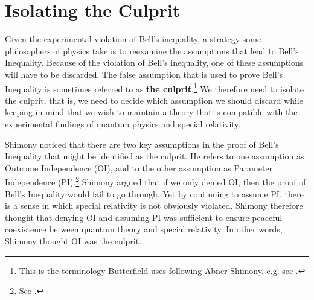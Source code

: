\documentclass[12pt]{report}
\providecommand{\DIFadd}[1]{{\protect\color{blue}\uwave{#1}}} %
\providecommand{\DIFaddbegin}{} %
\providecommand{\DIFaddend}{} %
\begin{document}
\section{Isolating the Culprit}
Given the experimental violation of Bell's inequality, a strategy some philosophers of physics take is to reexamine the assumptions that lead to Bell's Inequality. Because of the \DIFaddbegin \DIFadd{observed }\DIFaddend violation of Bell's inequality, one of these assumptions will have to be discarded. The false assumption that is used to prove Bell's Inequality is sometimes referred to as \textbf{the culprit}.\footnote{This is the terminology Butterfield uses following Abner Shimony. e.g. see \cite[1]{Butterfield}.} We therefore need to isolate the culprit, that is, we need to decide which assumption we should discard while keeping in mind that we wish to maintain a theory that is compatible with the experimental findings of quantum physics and special relativity.

Shimony noticed that there are two key assumptions in the proof of Bell's Inequality that might be identified as the culprit. He refers to one assumption as {Outcome Independence} (OI), %
%
and to the other assumption as {Parameter Independence} (PI).\footnote{See \cite[146-147]{Shimony86}.}  %
Shimony argued that if we only denied OI, then the proof of Bell's Inequality would fail to go through. Yet by continuing to assume PI, there is a sense in which special relativity is not obviously violated. Shimony therefore thought that denying OI and assuming PI was sufficient to ensure peaceful coexistence between quantum theory and special relativity. In other words, Shimony thought OI was the culprit. 


\end{document}
